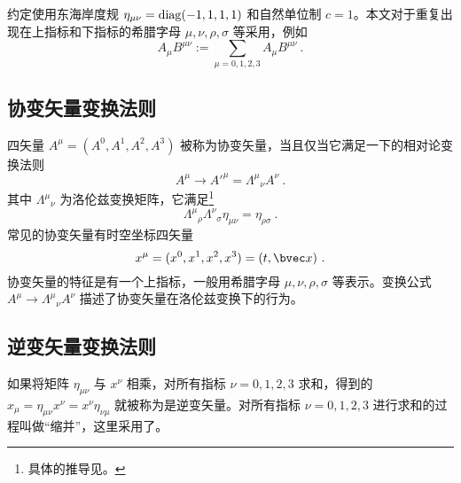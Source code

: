 

约定使用东海岸度规 $\eta_{\mu\nu}=\rm{diag}(-1,1,1,1)$ 和自然单位制 $c=1$。本文对于重复出现在上指标和下指标的希腊字母 $\mu,\nu,\rho,\sigma$ 等采用，例如
\begin{equation}
A_\mu B^{\mu\nu}:= \sum_{\mu=0,1,2,3}A_\mu B^{\mu\nu} ~.
\end{equation}

\subsection{协变矢量变换法则}
四矢量 $A^\mu=(A^0,A^1,A^2,A^3)$ 被称为协变矢量，当且仅当它满足一下的相对论变换法则
\begin{equation}\label{eq_vecspr_1}
A^\mu\rightarrow {A'}^\mu = \Lambda^{\mu}{}_\nu A^\nu~.
\end{equation}
其中 $\Lambda^\mu{}_\nu$ 为洛伦兹变换矩阵，它满足\footnote{具体的推导见。}
\begin{equation}\label{eq_vecspr_2}
\Lambda^{\mu}{}_{\rho} \Lambda^{\nu}{}_{\sigma} \eta_{\mu\nu} = \eta_{\rho\sigma}~.
\end{equation}
常见的协变矢量有时空坐标四矢量
\begin{equation}
x^\mu = (x^0,x^1,x^2,x^3) = (t,\bvec x)~.
\end{equation}
协变矢量的特征是有一个上指标，一般用希腊字母 $\mu,\nu,\rho,\sigma$ 等表示。变换公式 $A^\mu\rightarrow \Lambda^{\mu}{}_\nu A^\nu$ 描述了协变矢量在洛伦兹变换下的行为。

\subsection{逆变矢量变换法则}
如果将矩阵 $\eta_{\mu\nu}$ 与 $x^\nu$ 相乘，对所有指标 $\nu=0,1,2,3$ 求和，得到的 $x_\mu =\eta_{\mu\nu} x^\nu = x^\nu\eta_{\nu\mu}$ 就被称为是逆变矢量。对所有指标 $\nu=0,1,2,3$ 进行求和的过程叫做“缩并”，这里采用了。

